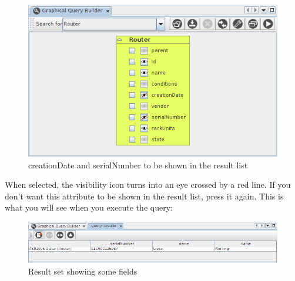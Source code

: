 \documentclass[a4paper]{article}
\begin{document}
	\begin{figure}[h!]
		\centering
		\includegraphics[width=0.9\linewidth]{img/query_node_attributes_selected.png}
		\caption{creationDate and serialNumber to be shown in the result list}
		\label{fig:query_node_attributes_selected}
	\end{figure}
	
	When selected, the visibility icon turns into an eye crossed by a red line. If you don't want this attribute to be shown in the result list, press it again. This is what you will see when you execute the query:
	
	\begin{figure}[h!]
		\centering
		\includegraphics[width=0.9\linewidth]{img/query_results_attributes_selected.png}
		\caption{Result set showing some fields}
		\label{fig:query_results_attributes_selected}
	\end{figure}
	
\end{document}
